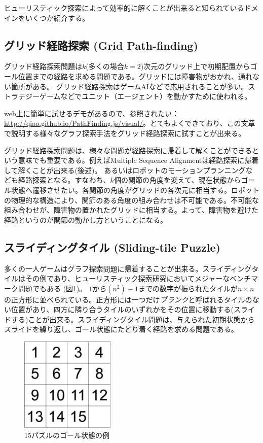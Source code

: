 \documentclass{report}
\begin{document}
ヒューリスティック探索によって効率的に解くことが出来ると知られているドメインをいくつか紹介する。


\subsection{グリッド経路探索 (Grid Path-finding)}

グリッド経路探索問題は$k$(多くの場合$k=2$)次元のグリッド上で初期配置からゴール位置までの経路を求める問題である。グリッドには障害物がおかれ、通れない箇所がある。
グリッド経路探索はゲームAIなどで応用されることが多い。ストラテジーゲームなどでユニット（エージェント）を動かすために使われる。

web上に簡単に試せるデモがあるので、参照されたい：\url{http://qiao.github.io/PathFinding.js/visual/}。とてもよくできており、この文章で説明する様々なグラフ探索手法をグリッド経路探索に試すことが出来る。

グリッド経路探索問題は、様々な問題が経路探索に帰着して解くことができるという意味でも重要である。例えばMultiple Sequence Alignmentは経路探索に帰着して解くことが出来る(後述)。
あるいはロボットのモーションプランニングなども経路探索となる。すなわち、$k$個の関節の角度を変えて、現在状態からゴール状態へ遷移させたい。各関節の角度がグリッドの各次元に相当する。ロボットの物理的な構造により、関節のある角度の組み合わせは不可能である。不可能な組み合わせが、障害物の置かれたグリッドに相当する。よって、障害物を避けた経路というのが関節の動かし方ということになる。



\subsection{スライディングタイル (Sliding-tile Puzzle)}

多くの一人ゲームはグラフ探索問題に帰着することが出来る。スライディングタイルはその例であり、ヒューリスティック探索研究においてメジャーなベンチマーク問題でもある (図\ref{fig:15-puzzle})。
$1$から$(n^2)-1$までの数字が振られたタイルが$n\times n$の正方形に並べられている。正方形には一つだけ{\it ブランク}と呼ばれるタイルのない位置があり、四方に隣り合うタイルのいずれかをその位置に移動する(スライドする)ことが出来る。スライディングタイル問題は、与えられた初期状態からスライドを繰り返し、ゴール状態にたどり着く経路を求める問題である。

\begin{figure}
\centering
\includegraphics[width=0.4\textwidth]{figures/15-puzzle.pdf}
\caption{15パズルのゴール状態の例}
\label{fig:15-puzzle}
\end{figure}
\end{document}
